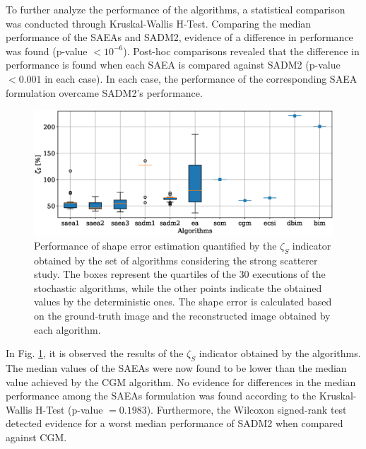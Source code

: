 			To further analyze the performance of the algorithms, a statistical comparison was conducted through Kruskal-Wallis H-Test. Comparing the median performance of the SAEAs and SADM2, evidence of a difference in performance was found (p-value $< 10^{-6}$). Post-hoc comparisons revealed that the difference in performance is found when each SAEA is compared against SADM2 (p-value $< 0.001$ in each case). In each case, the performance of the corresponding SAEA formulation overcame SADM2's performance.
		
			\begin{figure}
				\centering
				\includegraphics[width=.9\textwidth]{./figuras/casestudy/strong/boxplot_zeta_s}
				\caption[Performance of shape error estimation quantified by the $\zeta_S$ indicator obtained by the set of algorithms considering the strong scatterer case study.]{Performance of shape error estimation quantified by the $\zeta_S$ indicator obtained by the set of algorithms considering the strong scatterer study. The boxes represent the quartiles of the 30 executions of the stochastic algorithms, while the other points indicate the obtained values by the deterministic ones. The shape error is calculated based on the ground-truth image and the reconstructed image obtained by each algorithm.}
				\label{fig:results:casestudy:strong:boxplot:zeta_s}
			\end{figure}
		
			
			In Fig. \ref{fig:results:casestudy:strong:boxplot:zeta_s}, it is observed the results of the $\zeta_S$ indicator obtained by the algorithms. The median values of the SAEAs were now found to be lower than the median value achieved by the CGM algorithm. No evidence for differences in the median performance among the SAEAs formulation was found according to the Kruskal-Wallis H-Test (p-value $=0.1983$). Furthermore, the Wilcoxon signed-rank test detected evidence for a worst median performance of SADM2 when compared against CGM.
			

